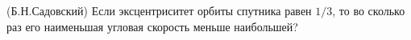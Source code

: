 (Б.Н.Садовский)
Если эксцентриситет орбиты спутника равен $1/3$, то во сколько раз его
наименьшая угловая скорость меньше наибольшей?
